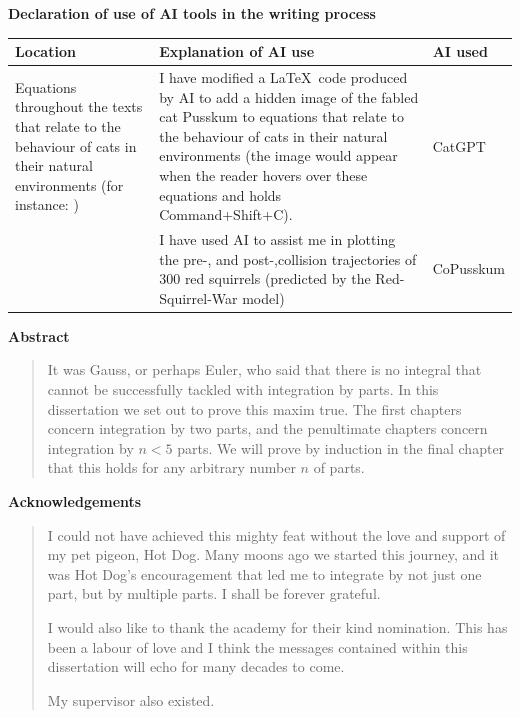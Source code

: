 \documentclass[12pt,a4paper,openany,twoside]{book}
\begin{document}
	\begin{center}
		\large\textbf{Declaration of use of AI tools in the writing process}
	\end{center}
	\begin{center}
        \renewcommand{\arraystretch}{1.3} %
		\begin{tabular}{p{4cm} p{9cm} p{2.2cm}}
			\toprule
			Location & Explanation of AI use & AI used \\
			\midrule
			Equations throughout the texts that relate to the behaviour of cats in their natural environments  (for instance: \Cref{euler}) & I have modified a \LaTeX ~code produced by AI to add a hidden image of the fabled cat Pusskum to equations that relate to the behaviour of cats in their natural environments (the image would appear when the reader hovers over these equations and holds Command+Shift+C). & CatGPT\\
			\Cref{fig:logistic-growth} & I have used AI to assist me in plotting the pre-, and post-,collision trajectories of 300 red squirrels (predicted by the Red-Squirrel-War model)  & CoPusskum\\
			\bottomrule
		\end{tabular}
	\end{center}
	
	
	\newpage
	
	\begin{center}
		\large\textbf{Abstract}
	\end{center}
	\begin{quote}
		It was Gauss, or perhaps Euler, who said that there is no integral that cannot be successfully tackled with integration by parts. In this dissertation we set out to prove this maxim true. The first chapters concern integration by two parts, and the penultimate chapters concern integration by $n < 5$ parts. We will prove by induction in the final chapter that this holds for any arbitrary number $n$ of parts.%
	\end{quote}
	
	\newpage
	
	\begin{center}
		\large\textbf{Acknowledgements}
	\end{center}
	\begin{quote}
		I could not have achieved this mighty feat without the love and support of my pet pigeon, Hot Dog. Many moons ago we started this journey, and it was Hot Dog's encouragement that led me to integrate by not just one part, but by multiple parts. I shall be forever grateful. 
		
		I would also like to thank the academy for their kind nomination. This has been a labour of love and I think the messages contained within this dissertation will echo for many decades to come.
		
		My supervisor also existed.
	\end{quote}
	\newpage
	
\end{document}
